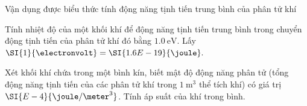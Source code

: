 \begin{dang}{Vận dụng được biểu thức tính động năng tịnh tiến trung bình của phân tử khí}
\end{dang}
\begin{vd}
	Tính nhiệt độ của một khối khí để động năng tịnh tiến trung bình trong chuyển động tịnh tiến của phân tử khí đó bằng $\SI{1.0}{\electronvolt}$. Lấy $\SI{1}{\electronvolt}=\SI{1.6E-19}{\joule}.$
\end{vd}
\begin{vd}
	Xét khối khí chứa trong một bình kín, biết mật độ động năng phân tử (tổng động năng tịnh tiến của các phân tử khí trong $\SI{1}{\meter^3}$ thể tích khí) có giá trị $\SI{E-4}{\joule/\meter^3}$. Tính áp suất của khí trong bình.
\end{vd}
